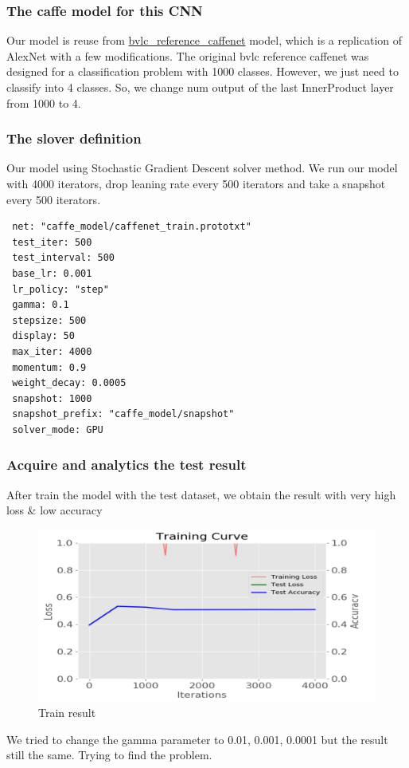 \documentclass[11pt]{article}
\begin{document}
\subsubsection{The caffe model for this CNN}
Our model is reuse from \href{https://github.com/BVLC/caffe/tree/master/models/bvlc\_reference\_caffenet}{bvlc\_reference\_caffenet} model, which is a replication of AlexNet with a few modifications. The original bvlc reference caffenet was designed for a classification problem with 1000 classes. However, we just need to classify into 4 classes. So, we change num output of the last
InnerProduct layer from 1000 to 4.

\subsubsection{The slover definition}
Our model using Stochastic Gradient Descent solver method. We run our model with 4000 iterators, drop leaning rate every 500 iterators and take a snapshot every 500 iterators.
\begin{verbatim}
 net: "caffe_model/caffenet_train.prototxt"
 test_iter: 500
 test_interval: 500
 base_lr: 0.001
 lr_policy: "step"
 gamma: 0.1
 stepsize: 500
 display: 50
 max_iter: 4000
 momentum: 0.9
 weight_decay: 0.0005
 snapshot: 1000
 snapshot_prefix: "caffe_model/snapshot"
 solver_mode: GPU
\end{verbatim}

\subsubsection{Acquire and analytics the test result}

After train the model with the test dataset, we obtain the result with very high loss \& low accuracy

\begin{figure}[H]
\centering
\includegraphics[width=1\textwidth]{images/train_first_time}
\caption{Train result}
\end{figure}
We tried to change the gamma parameter to 0.01, 0.001, 0.0001 but the result still the same. Trying to find the problem.
\end{document}
